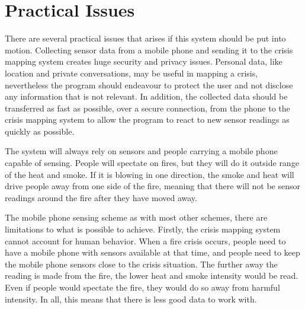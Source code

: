 \section {Practical Issues}
There are several practical issues that arises if this system should be put into motion. Collecting sensor data from a mobile phone and sending it to the crisis mapping system creates huge security and privacy issues. Personal data, like location and private conversations, may be useful in mapping a crisis, nevertheless the program should endeavour to protect the user and not disclose any information that is not relevant. In addition, the collected data should be transferred as fast as possible, over a secure connection, from the phone to the crisis mapping system to allow the program to react to new sensor readings as quickly as possible.

The system will always rely on sensors and people carrying a mobile phone capable of sensing. People will spectate on fires, but they will do it outside range of the heat and smoke. If it is blowing in one direction, the smoke and heat will drive people away from one side of the fire, meaning that there will not be sensor readings around the fire after they have moved away.

The mobile phone sensing scheme as with most other schemes, there are limitations to what is possible to achieve. Firstly, the crisis mapping system cannot account for human behavior. When a fire crisis occurs, people need to have a mobile phone with sensors available at that time, and people need to keep the mobile phone sensors close to the crisis situation. The further away the reading is made from the fire, the lower heat and smoke intensity would be read. Even if people would spectate the fire, they would do so away from harmful intensity. In all, this means that there is less good data to work with.